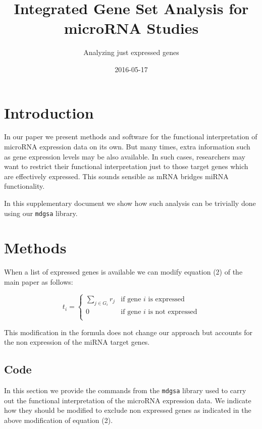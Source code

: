 \documentclass[]{article}
\title{Integrated Gene Set Analysis for microRNA Studies}
\author{Analyzing just expressed genes}
\date{2016-05-17}
\begin{document}
\maketitle

\section{Introduction}\label{introduction}

In our paper we present methods and software for the functional
interpretation of microRNA expression data on its own. But many times,
extra information such as gene expression levels may be also available.
In such cases, researchers may want to restrict their functional
interpretation just to those target genes which are effectively
expressed. This sounds sensible as mRNA bridges miRNA functionality.

In this supplementary document we show how such analysis can be
trivially done using our \texttt{mdgsa} library.

\section{Methods}\label{methods}

When a list of expressed genes is available we can modify equation (2)
of the main paper as follows:

\begin{equation*}
t_i =
\begin{cases}
  \sum_{j \in G_i} r_{j}  & \text{if gene } i \text{ is expressed}\\
  0                       & \text{if gene } i \text{ is not expressed}\\
\end{cases}
\end{equation*}

This modification in the formula does not change our approach but
accounts for the non expression of the miRNA target genes.

\subsection{Code}\label{code}

In this section we provide the commands from the \texttt{mdgsa} library
used to carry out the functional interpretation of the microRNA
expression data. We indicate how they should be modified to exclude non
expressed genes as indicated in the above modification of equation (2).
\end{document}
